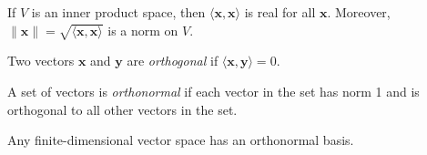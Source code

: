 \begin{prop}
  If $V$ is an inner product space, then $\langle\mathbf x,\mathbf x\rangle$ is
  real for all $\mathbf x$.
  Moreover, $\|\mathbf x\|=\sqrt{\langle\mathbf x,\mathbf x\rangle}$ is a norm
  on $V$.
\end{prop}
\begin{defn}
  Two vectors $\mathbf x$ and $\mathbf y$ are \emph{orthogonal} if $\langle
  \mathbf x,\mathbf y\rangle=0$.

  A set of vectors is \emph{orthonormal} if each vector in the set has norm 1
  and is orthogonal to all other vectors in the set.
\end{defn}
\begin{prop}
  Any finite-dimensional vector space has an orthonormal basis.
\end{prop}
